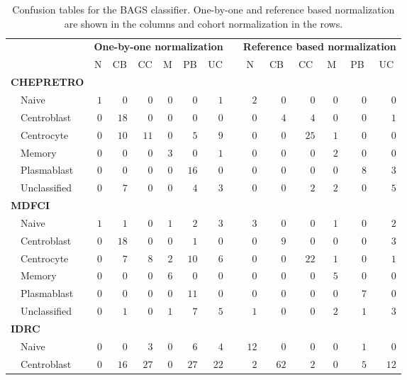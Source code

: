 \begin{table}[!tbp]
\begin{adjustwidth}{-1in}{0in}
{\small
\caption{Confusion tables for the BAGS classifier. One-by-one and reference
based normalization are shown in the columns and cohort normalization in the
rows.\label{tab:BAGShemaclass}} 
\begin{center}
\begin{tabular}{lrrrrrrcrrrrrr}
\hline\hline
\multicolumn{1}{l}{\bfseries }&\multicolumn{6}{c}{\bfseries One-by-one normalization}&\multicolumn{1}{c}{\bfseries }&\multicolumn{6}{c}{\bfseries Reference based normalization}\tabularnewline
\cline{2-7} \cline{9-14}
\multicolumn{1}{l}{}&\multicolumn{1}{c}{N}&\multicolumn{1}{c}{CB}&\multicolumn{1}{c}{CC}&\multicolumn{1}{c}{M}&\multicolumn{1}{c}{PB}&\multicolumn{1}{c}{UC}&\multicolumn{1}{c}{}&\multicolumn{1}{c}{N}&\multicolumn{1}{c}{CB}&\multicolumn{1}{c}{CC}&\multicolumn{1}{c}{M}&\multicolumn{1}{c}{PB}&\multicolumn{1}{c}{UC}\tabularnewline
\hline
{\bfseries CHEPRETRO}&&&&&&&&&&&&&\tabularnewline
~~Naive&$1$&$ 0$&$  0$&$0$&$ 0$&$ 1$&&$ 2$&$ 0$&$  0$&$ 0$&$ 0$&$ 0$\tabularnewline
~~Centroblast&$0$&$18$&$  0$&$0$&$ 0$&$ 0$&&$ 0$&$ 4$&$  4$&$ 0$&$ 0$&$ 1$\tabularnewline
~~Centrocyte&$0$&$10$&$ 11$&$0$&$ 5$&$ 9$&&$ 0$&$ 0$&$ 25$&$ 1$&$ 0$&$ 0$\tabularnewline
~~Memory&$0$&$ 0$&$  0$&$3$&$ 0$&$ 1$&&$ 0$&$ 0$&$  0$&$ 2$&$ 0$&$ 0$\tabularnewline
~~Plasmablast&$0$&$ 0$&$  0$&$0$&$16$&$ 0$&&$ 0$&$ 0$&$  0$&$ 0$&$ 8$&$ 3$\tabularnewline
~~Unclassified&$0$&$ 7$&$  0$&$0$&$ 4$&$ 3$&&$ 0$&$ 0$&$  2$&$ 2$&$ 0$&$ 5$\tabularnewline
\hline
{\bfseries MDFCI}&&&&&&&&&&&&&\tabularnewline
~~Naive&$1$&$ 1$&$  0$&$1$&$ 2$&$ 3$&&$ 3$&$ 0$&$  0$&$ 1$&$ 0$&$ 2$\tabularnewline
~~Centroblast&$0$&$18$&$  0$&$0$&$ 1$&$ 0$&&$ 0$&$ 9$&$  0$&$ 0$&$ 0$&$ 3$\tabularnewline
~~Centrocyte&$0$&$ 7$&$  8$&$2$&$10$&$ 6$&&$ 0$&$ 0$&$ 22$&$ 1$&$ 0$&$ 1$\tabularnewline
~~Memory&$0$&$ 0$&$  0$&$6$&$ 0$&$ 0$&&$ 0$&$ 0$&$  0$&$ 5$&$ 0$&$ 0$\tabularnewline
~~Plasmablast&$0$&$ 0$&$  0$&$0$&$11$&$ 0$&&$ 0$&$ 0$&$  0$&$ 0$&$ 7$&$ 0$\tabularnewline
~~Unclassified&$0$&$ 1$&$  0$&$1$&$ 7$&$ 5$&&$ 1$&$ 0$&$  0$&$ 2$&$ 1$&$ 3$\tabularnewline
\hline
{\bfseries IDRC}&&&&&&&&&&&&&\tabularnewline
~~Naive&$0$&$ 0$&$  3$&$0$&$ 6$&$ 4$&&$12$&$ 0$&$  0$&$ 0$&$ 1$&$ 0$\tabularnewline
~~Centroblast&$0$&$16$&$ 27$&$0$&$27$&$22$&&$ 2$&$62$&$  2$&$ 0$&$ 5$&$12$\tabularnewline

\end{tabular}
\end{center}}
\end{adjustwidth}
\end{table}
